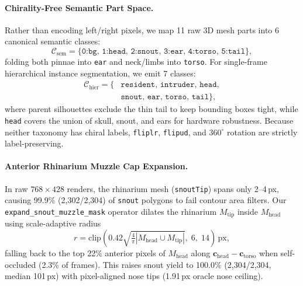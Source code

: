 \documentclass[10pt,twocolumn,letterpaper]{article}
\begin{document}
\paragraph{Chirality-Free Semantic Part Space.} Rather than encoding left/right pixels, we map 11 raw 3D mesh parts into 6 canonical semantic classes:
{\small
\begin{equation}
  \mathcal{C}_{\text{sem}} = \{\texttt{0:bg},\, \texttt{1:head},\, \texttt{2:snout},\, \texttt{3:ear},\, \texttt{4:torso},\, \texttt{5:tail}\},
\end{equation}}
folding both pinnae into \texttt{ear} and neck/limbs into \texttt{torso}. For single-frame hierarchical instance segmentation, we emit 7 classes:
{\small
\begin{equation}
  \begin{aligned}
    \mathcal{C}_{\text{hier}} = \{&\texttt{resident},\, \texttt{intruder},\, \texttt{head},\\
    &\texttt{snout},\, \texttt{ear},\, \texttt{torso},\, \texttt{tail}\},
  \end{aligned}
\end{equation}}
where parent silhouettes exclude the thin tail to keep bounding boxes tight, while \texttt{head} covers the union of skull, snout, and ears for hardware robustness. Because neither taxonomy has chiral labels, \texttt{fliplr}, \texttt{flipud}, and $360^\circ$ rotation are strictly label-preserving.

\paragraph{Anterior Rhinarium Muzzle Cap Expansion.} In raw $768\times 428$ renders, the rhinarium mesh (\texttt{snoutTip}) spans only 2--4\,px, causing 99.9\% (2,302/2,304) of \texttt{snout} polygons to fail contour area filters. Our \texttt{expand\_snout\_muzzle\_mask} operator dilates the rhinarium $M_{\text{tip}}$ inside $M_{\text{head}}$ using scale-adaptive radius
{\small
\begin{equation}
  r = \mathrm{clip}\!\left(0.42 \sqrt{\tfrac{4}{\pi}|M_{\text{head}} \cup M_{\text{tip}}|},\; 6,\; 14\right)\,\text{px},
\end{equation}}
falling back to the top 22\% anterior pixels of $M_{\text{head}}$ along $\mathbf{c}_{\text{head}}-\mathbf{c}_{\text{torso}}$ when self-occluded (2.3\% of frames). This raises snout yield to 100.0\% (2,304/2,304, median 101\,px) with pixel-aligned nose tips (1.91\,px oracle nose ceiling).
\end{document}
